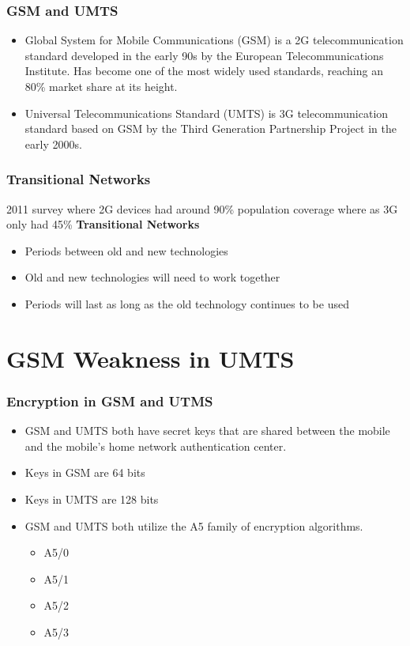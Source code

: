 \documentclass{beamer}
\begin{document}
		\begin{frame}
		\frametitle{GSM and UMTS}
		\begin{itemize}
		\item Global System for Mobile Communications (GSM) is a 2G telecommunication standard developed in the early 90s by the European Telecommunications Institute. Has become one of the most widely used standards, reaching an 80\% market share at its height.
					
		
		\item Universal Telecommunications Standard (UMTS) is 3G telecommunication standard based on GSM by the Third Generation Partnership Project in the early 2000s.   
		\end{itemize}
	\end{frame}
	
	\begin{frame}
	\frametitle{Transitional Networks}
	
		
		2011 survey where 2G devices had around 90\% population coverage where as 3G only had 45\%
		\textbf{Transitional Networks}
		\begin{itemize}
			\item Periods between old and new technologies 
			\item Old and new technologies will need to work together
			\item Periods will last as long as the old technology continues to be used 
		\end{itemize}
\end{frame}

	
\section{GSM Weakness in UMTS}

	

	\begin{frame}
	\frametitle{Encryption in GSM and UTMS}
	\begin{itemize}
	
	
		\item GSM and UMTS both have secret keys that are shared between the mobile and the mobile's home network authentication center.
		\item Keys in GSM are 64 bits
		\item Keys in UMTS are 128 bits
		
		\item GSM and UMTS both utilize the A5 family of encryption algorithms. 
		 \begin{itemize}
			\item A5/0 
			\item A5/1
			\item A5/2
			\item A5/3 
		\end{itemize}
		\end{itemize}
	\end{frame}
	
\end{document}
